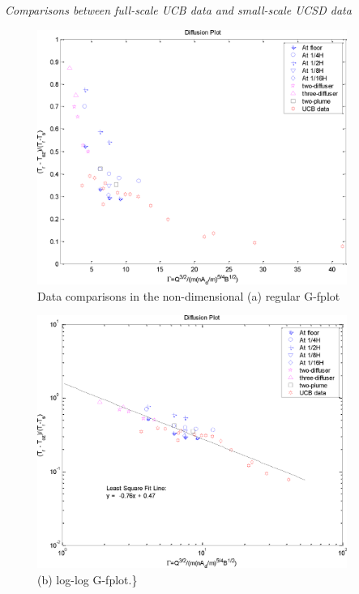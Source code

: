 \emph{Comparisons between full-scale UCB data and small-scale UCSD data}

\begin{figure}[hbtp] %
\centering
\includegraphics[width=0.9\textwidth, height=0.9\textheight, keepaspectratio=true]{media/image2469.png}
\caption{Data comparisons in the non-dimensional (a) regular G-fplot \protect \label{fig:data-comparisons-in-the-non-dimensional-a}}
\end{figure}

\begin{figure}[hbtp] %
\centering
\includegraphics[width=0.9\textwidth, height=0.9\textheight, keepaspectratio=true]{media/image2470.png}
\caption{(b) log-log G-fplot.\} \protect \label{fig:b-log-log-g-fplot.}}
\end{figure}

